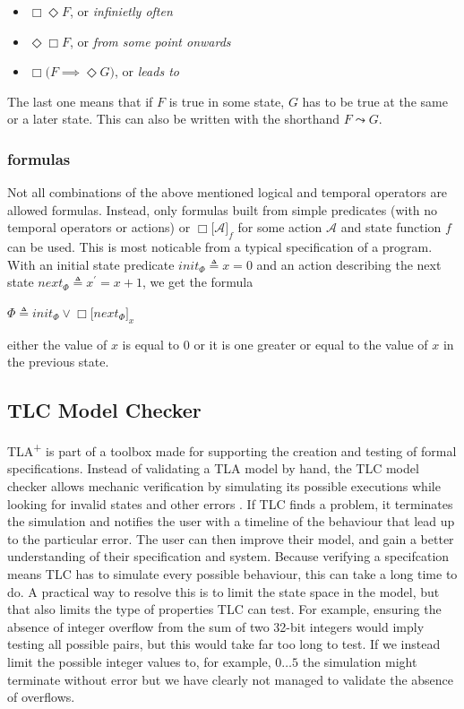 \documentclass[english, biblatex, digitaloutput]{kththesis}
\begin{document}
\begin{itemize}
	\item $\Box\Diamond F$, or \textit{infinietly often}
	\item $\Diamond\Box F$, or \textit{from some point onwards}
	\item $\Box \lparen F \implies \Diamond G \rparen$, or \textit{leads to}
\end{itemize}

The last one means that if $F$ is true in some state, $G$ has to be true at the same or a later state. This can also be written with the shorthand $F \leadsto G$.

\subsubsection{ formulas}

Not all combinations of the above mentioned logical and temporal operators are allowed  formulas. Instead, only formulas built from simple predicates (with no temporal operators or actions) or $\Box \lbrack \mathcal{A}  \rbrack_{f}$ for some action $\mathcal{A}$ and state function $f$ can be used. This is most noticable from a typical  specification of a program. With an initial state predicate $init_\Phi \triangleq x = 0$ and an action describing the next state $next_\Phi \triangleq x^\prime = x + 1$, we get the  formula

\begin{math}
	\Phi \triangleq init_\Phi \lor \Box \lbrack next_\Phi \rbrack_x
\end{math}

\ie either the value of $x$ is equal to 0 or it is one greater or equal to the value of $x$ in the previous state.

\subsection{TLC Model Checker}

TLA\textsuperscript+ is part of a toolbox made for supporting the creation and testing of formal specifications. Instead of validating a TLA model by hand, the TLC model checker allows mechanic verification by simulating its possible executions while looking for invalid states and other errors \cite{goos_model_1999}. If TLC finds a problem, it terminates the simulation and notifies the user with a timeline of the behaviour that lead up to the particular error. The user can then improve their model, and gain a better understanding of their specification and system. Because verifying a specifcation means TLC has to simulate every possible behaviour, this can take a long time to do. A practical way to resolve this is to limit the state space in the model, but that also limits the type of properties TLC can test. For example, ensuring the absence of integer overflow from the sum of two 32-bit integers would imply testing all possible pairs, but this would take far too long to test. If we instead limit the possible integer values to, for example, $0 \dotsc 5$ the simulation might terminate without error but we have clearly not managed to validate the absence of overflows.
\end{document}
